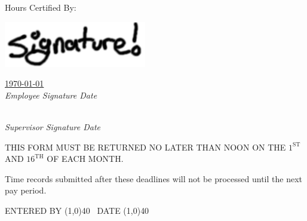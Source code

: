 \documentclass[letterpaper,12pt]{article}
\begin{document}
\newcommand{\signature}[2]{
    \underline{#2} \\
    {\it \small #1 Signature \hspace{3in} Date}
}

\vspace{10px}
Hours Certified By:

\vspace{-0.2in} \hspace{1.5in} \includegraphics[scale=0.5]{signature.png}
\begin{center}
    \vspace{-0.48in}
    \signature{Employee}{\hspace{4.6in} \today \hspace{0.3in}}

    \vspace{0.25in}
    \signature{Supervisor}{\hspace{6in}}
\end{center}

\useunder{\uline}{\ulined}{}%
\DeclareUrlCommand{\bulurl}{\def\UrlFont{\it \color{blue}\ulined}}

\vfill
\begin{center} \small
    THIS FORM MUST BE RETURNED NO LATER THAN NOON ON THE $1^{\mathrm{ST}}$
    AND $16^{\mathrm{TH}}$ OF EACH MONTH.

    Time records submitted after these deadlines will not be processed until
    the next pay period.
\end{center}

\vspace{0.1in}
\hfill ENTERED BY \line(1,0){40} \, DATE \line(1,0){40}
\end{document}
